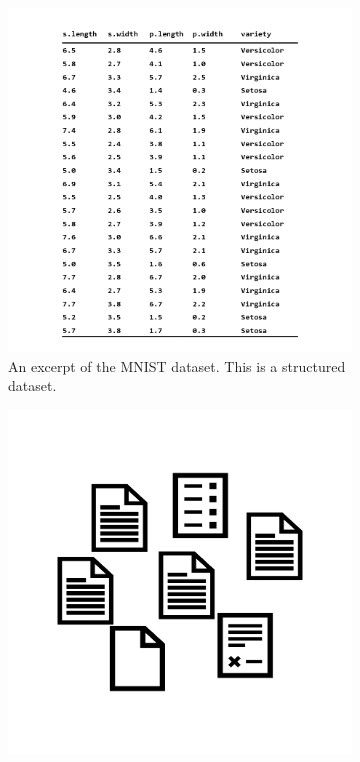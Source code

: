 \documentclass[./../../paper.tex]{subfiles}
\begin{document}
\begin{figure}
    \centering
    \begin{subfigure}[c]{0.49\textwidth}
        \centering
        \includegraphics[width=\textwidth]{figures/Graphics/Slide1.png}
        \caption{An excerpt of the MNIST dataset. This is a structured dataset.}
        \label{fig:structured}
    \end{subfigure}
    \hfill
    \begin{subfigure}[c]{0.49\textwidth}
        \centering
        \includegraphics[width=\textwidth]{figures/Graphics/Slide3.png}

\end{subfigure}
\end{figure}
\end{document}
